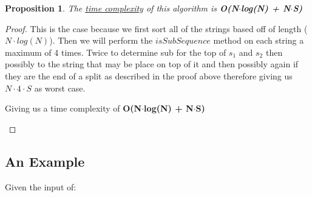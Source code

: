 \documentclass[12pt]{article}
\newtheorem{proposition}[theorem]{Proposition}
\begin{document}
\begin{proposition}
\label{numq}
The \underline{time complexity} of this algorithm is \textbf{O(N$\cdot$log(N) + N$\cdot$S)}
\end{proposition}

\begin{proof}
This is the case because we first sort all of the strings based off of length ($N\cdot log(N)$). Then we will
perform the $isSubSequence$ method on each string a maximum of 4 times. Twice to determine sub for the top of
$s_1$ and $s_2$ then possibly to the string that may be place on top of it and then possibly again if they are
the end of a split as described in the proof above therefore giving us $N\cdot4\cdot S$ as worst case.

\begin{center}
    Giving us a time complexity of \textbf{O(N$\cdot$log(N) + N$\cdot$S)}
\end{center}
\end{proof}


\subsection{An Example}
Given the input of:  \\


\end{document}
